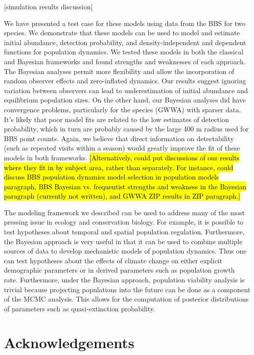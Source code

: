 \documentclass[12pt]{article}
\begin{document}
[simulation results discussion]

We have presented a test case for these models using data from
the BBS for two species. We demonstrate that these models can be
used to model and estimate initial abundance, detection
probability, and density-independent and dependent functions for
population dynamics. We tested these models in both the
classical and Bayesian frameworks and found strengths and
weaknesses of each approach. The Bayesian analyses permit more
flexibility and allow the incorporation of random observer
effects and zero-inflated dynamics. Our results suggest ignoring
variation between observers can lead to underestimation of
initial abundance and equilibrium population sizes. On the other
hand, our Bayesian analyses did have convergence problems,
particularly for the species (GWWA) with sparser data. It's
likely that poor model fits are related to the low estimates of
detection probability, which in turn are probably caused by the
large 400 m radius used for BBS point counts. Again, we believe
that direct information on detectability (such as repeated
visits within a season) would greatly improve the fit of these
models in both frameworks.
\hl{[Alternatively, could put discussions of our results where
they fit in by subject area, rather than separately. For
instance, could discuss BBS population dynamics model selection
in population models paragraph, BBS Bayesian vs.
frequentist strengths and weakness in the Bayesian paragraph
(currently not written), and GWWA ZIP results in ZIP paragraph.]}

The modeling framework we described can be used to address many of the
most pressing issue in ecology and conservation biology. For example,
it is possible to test hypotheses about temporal and spatial
population regulation. Furthermore, the Bayesian approach is very
useful in that it can be used to combine multiple sources of data to
develop mechanistic models of population dynamics. Thus one can test
hypotheses about the effects of climate change on either explicit
demographic parameters or in derived parameters such as population
growth rate. Furthermore, under the Bayesian approach, population
viability analysis is trivial because projecting populations into the
future can be done as a component of the MCMC analysis. This allows
for the computation of posterior distributions of parameters such as
quasi-extinction probability.


\section{Acknowledgements}
\end{document}
